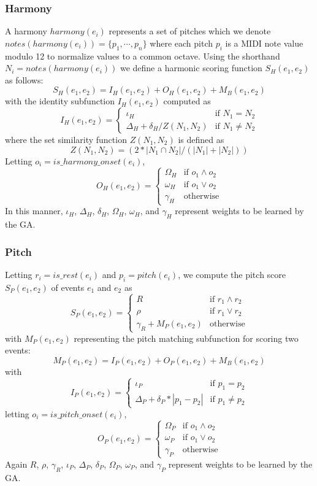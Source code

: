 \documentclass[phd,electronic,oneside,twosidetoc,letterpaper,chaptercenter,parttop,lof,lot]{byumsphd}
\begin{document}
\subsubsection{Harmony}

A harmony $harmony(e_i)$ represents a set of pitches which we denote $notes(harmony(e_i)) = \{p_1,\cdots,p_n\}$ where each pitch $p_i$ is a MIDI note value modulo 12 to normalize values to a common octave. Using the shorthand $N_i = notes(harmony(e_i))$ we define a harmonic scoring function $S_H(e_1,e_2)$ as follows:
\[
  S_H(e_1,e_2) = I_H(e_1,e_2) + O_H(e_1,e_2) + M_B(e_1,e_2)
\]
\noindent with the identity subfunction $I_H(e_1,e_2)$ computed as
\[ I_H(e_1,e_2) = 
  \begin{cases}
  	\iota_H & \text{if } N_1 = N_2 \\
    \Delta_H + \delta_H/ Z(N_1,N_2) & \text{if } N_1 \neq N_2
  \end{cases}
\]
\noindent where the set similarity function $Z(N_1,N_2)$ is defined as
\[
Z(N_1,N_2) = (2*|N_1\cap N_2|/(|N_1|+|N_2|))
\]
\noindent Letting $o_i = is\_harmony\_onset(e_i)$,
\[ O_H(e_1,e_2) = 
  \begin{cases}
  	\Omega_H & \text{if } o_1 \land o_2 \\
    \omega_H & \text{if } o_1 \lor o_2 \\
    \gamma_H & \text{otherwise}
  \end{cases}
\]
\noindent In this manner, $\iota_H$, $\Delta_H$, $\delta_H$, $\Omega_H$, $\omega_H$, and $\gamma_H$ represent weights to be learned by the GA.

\subsubsection{Pitch}

Letting $r_i = is\_rest(e_i)$ and $p_i = pitch(e_i)$, we compute the pitch score $S_P(e_1,e_2)$ of events $e_1$ and $e_2$ as 
\[
S_P(e_1,e_2) =
  \begin{cases}
	R & \text{if } r_1 \land r_2 \\
	\rho & \text{if } r_1 \lor r_2 \\ 
    \gamma_R + M_P(e_1,e_2) & \text{otherwise}
  \end{cases}
\]
\noindent with $M_P(e_1,e_2)$ representing the pitch matching subfunction for scoring two events:
\[ M_P(e_1,e_2) = I_P(e_1,e_2) + O_P(e_1,e_2) + M_B(e_1,e_2) \]
\noindent with
\[ I_P(e_1,e_2) = 
  \begin{cases}
  	\iota_P & \text{if } p_1 = p_2 \\
    \Delta_P + \delta_P * |p_1-p_2| & \text{if } p_1 \neq p_2
  \end{cases}
\]
\noindent letting $o_i = is\_pitch\_onset(e_i)$,
\[ O_P(e_1,e_2) = 
  \begin{cases}
  	\Omega_P & \text{if } o_1 \land o_2 \\
    \omega_P & \text{if } o_1 \lor o_2 \\
    \gamma_P & \text{otherwise}
  \end{cases}
\]
\noindent Again $R$, $\rho$, $\gamma_R$, $\iota_P$, $\Delta_P$, $\delta_P$, $\Omega_P$, $\omega_P$, and $\gamma_P$ represent weights to be learned by the GA.
\end{document}
